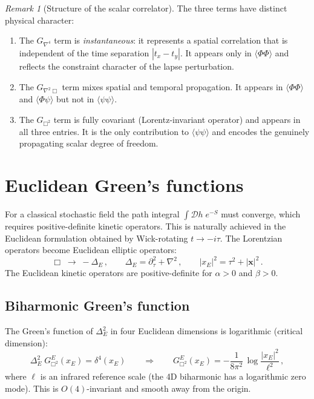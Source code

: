 \documentclass[11pt,a4paper]{article}
\newcommand{\Lap}{\Delta}
\theoremstyle{definition}
\theoremstyle{remark}
\newtheorem{remark}{Remark}
\begin{document}
\begin{remark}[Structure of the scalar correlator]
The three terms have distinct physical character:
\begin{enumerate}
\item The $G_{\nabla^4}$ term is \emph{instantaneous}: it
  represents a spatial correlation that is independent of the time
  separation $|t_x - t_y|$.  It appears only in
  $\langle\Phi\Phi\rangle$ and reflects the constraint character
  of the lapse perturbation.
\item The $G_{\nabla^2\Box}$ term mixes spatial and temporal
  propagation.  It appears in $\langle\Phi\Phi\rangle$ and
  $\langle\Phi\psi\rangle$ but not in $\langle\psi\psi\rangle$.
\item The $G_{\Box^2}$ term is fully covariant (Lorentz-invariant
  operator) and appears in all three entries.
  It is the only contribution to $\langle\psi\psi\rangle$ and
  encodes the genuinely propagating scalar degree of freedom.
\end{enumerate}
\end{remark}

\section{Euclidean Green's functions}
\label{sec:euclidean}

For a classical stochastic field the path integral $\int\!\mathcal{D}h\;
e^{-S}$ must converge, which requires positive-definite kinetic operators.
This is naturally achieved in the Euclidean formulation obtained by
Wick-rotating $t \to -i\tau$.  The Lorentzian operators become
Euclidean elliptic operators:
\begin{equation}
  \Box \;\to\; -\Lap_E\,,\qquad
  \Lap_E = \partial_\tau^2 + \nabla^2\,,\qquad
  |x_E|^2 = \tau^2 + |\mathbf{x}|^2\,.
\end{equation}
The Euclidean kinetic operators are positive-definite for
$\alpha > 0$ and $\beta > 0$.

\subsection{Biharmonic Green's function}

The Green's function of $\Lap_E^2$ in four Euclidean dimensions is
logarithmic (critical dimension):
\begin{equation}\label{eq:GE-biharm}
  \boxed{
  \Lap_E^2\; G_{\Box^2}^E(x_E) = \delta^4(x_E)
  \qquad\Longrightarrow\qquad
  G_{\Box^2}^E(x_E) = -\frac{1}{8\pi^2}\,
    \log\frac{|x_E|^2}{\ell^2}\,,}
\end{equation}
where $\ell$ is an infrared reference scale (the 4D biharmonic has a
logarithmic zero mode).  This is $O(4)$-invariant and smooth away
from the origin.
\end{document}
